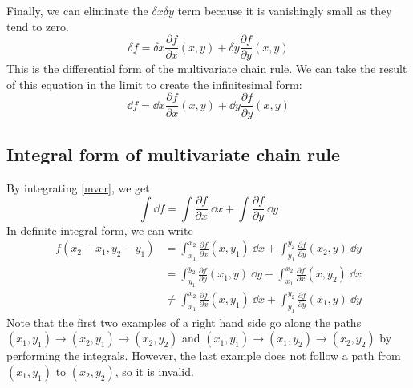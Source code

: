 Finally, we can eliminate the \(\delta x \delta y\) term because it is vanishingly small as they tend to zero.
\begin{equation}
	\delta f = \delta x \frac{\partial f}{\partial x}(x, y) +
	\delta y\frac{\partial f}{\partial y}(x, y)
\end{equation}
This is the differential form of the multivariate chain rule.
We can take the result of this equation in the limit to create the infinitesimal form:
\begin{equation}\label{mvcr}
	\dd{f} = \dd{x} \frac{\partial f}{\partial x}(x, y) +
	\dd{y}\frac{\partial f}{\partial y}(x, y)
\end{equation}

\subsection{Integral form of multivariate chain rule}
By integrating \eqref{mvcr}, we get
\[
	\int \dd{f} = \int \frac{\partial f}{\partial x}\ \dd{x} + \int \frac{\partial f}{\partial y}\ \dd{y}
\]
In definite integral form, we can write
\begin{align*}
	f(x_2 - x_1, y_2 - y_1) & = \int_{x_1}^{x_2} \frac{\partial f}{\partial x}(x, y_1)\ \dd{x} + \int_{y_1}^{y_2} \frac{\partial f}{\partial y}(x_2, y)\ \dd{y}    \\
	                        & = \int_{y_1}^{y_2} \frac{\partial f}{\partial y}(x_1, y)\ \dd{y} + \int_{x_1}^{x_2} \frac{\partial f}{\partial x}(x, y_2)\ \dd{x}    \\
	                        & \neq \int_{x_1}^{x_2} \frac{\partial f}{\partial x}(x, y_1)\ \dd{x} + \int_{y_1}^{y_2} \frac{\partial f}{\partial y}(x_1, y)\ \dd{y}
\end{align*}
Note that the first two examples of a right hand side go along the paths \((x_1, y_1) \to (x_2, y_1) \to (x_2, y_2)\) and \((x_1, y_1) \to (x_1, y_2) \to (x_2, y_2)\) by performing the integrals.
However, the last example does not follow a path from \((x_1, y_1)\) to \((x_2, y_2)\), so it is invalid.
